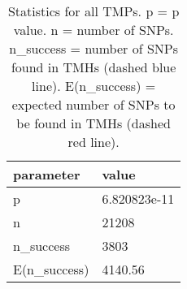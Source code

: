 \begin{table}

\caption{\label{tab:snp_stats}Statistics for all TMPs. p = p value. n = number of SNPs. n\_success = number of SNPs found in TMHs (dashed blue line). E(n\_success) = expected number of SNPs to be found in TMHs (dashed red line). }
\centering
\begin{tabular}[t]{l|l}
\hline
parameter & value\\
\hline
p & 6.820823e-11\\
\hline
n & 21208\\
\hline
n\_success & 3803\\
\hline
E(n\_success) & 4140.56\\
\hline
\end{tabular}
\end{table}